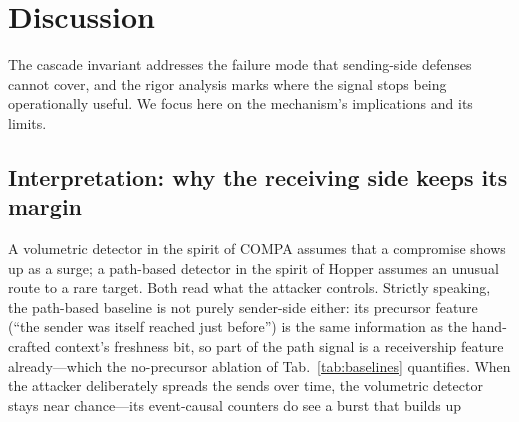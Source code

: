 \section{Discussion}
\label{sec:discussion}

The cascade invariant addresses the failure mode that sending-side defenses cannot cover, and the rigor
analysis marks where the signal stops being operationally useful. We focus here on the mechanism's
implications and its limits.

\subsection{Interpretation: why the receiving side keeps its margin}
A volumetric detector in the spirit of COMPA \citep{stringhini2015thataint} assumes that a compromise shows up
as a surge; a path-based detector in the spirit of Hopper \citep{ho2021hopper} assumes an unusual route to a
rare target. Both read what the attacker controls. %
Strictly speaking, the path-based baseline is not purely sender-side either: its precursor feature (``the
sender was itself reached just before'') is the same information as the hand-crafted context's freshness
bit, so part of the path signal is a receivership feature already---which the no-precursor ablation of
Tab.~\ref{tab:baselines} quantifies. %
When the attacker deliberately spreads the sends over
time, the volumetric detector stays near chance---its event-causal counters do see a burst that builds up
